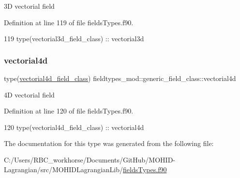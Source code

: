 3D vectorial field 



Definition at line 119 of file fields\+Types.\+f90.


\begin{DoxyCode}
119         \textcolor{keywordtype}{type}(vectorial3d\_field\_class) :: vectorial3d
\end{DoxyCode}
\mbox{\label{structfieldtypes__mod_1_1generic__field__class_a9a4f0f601cf52de94dcbbaa0a48bcf95}} 
\subsubsection{\texorpdfstring{vectorial4d}{vectorial4d}}
{\footnotesize\ttfamily type(\mbox{\hyperlink{structfieldtypes__mod_1_1vectorial4d__field__class}{vectorial4d\+\_\+field\+\_\+class}}) fieldtypes\+\_\+mod\+::generic\+\_\+field\+\_\+class\+::vectorial4d\hspace{0.3cm}{\ttfamily [private]}}



4D vectorial field 



Definition at line 120 of file fields\+Types.\+f90.


\begin{DoxyCode}
120         \textcolor{keywordtype}{type}(vectorial4d\_field\_class) :: vectorial4d
\end{DoxyCode}


The documentation for this type was generated from the following file\+:\begin{DoxyCompactItemize}
\item 
C\+:/\+Users/\+R\+B\+C\+\_\+workhorse/\+Documents/\+Git\+Hub/\+M\+O\+H\+I\+D-\/\+Lagrangian/src/\+M\+O\+H\+I\+D\+Lagrangian\+Lib/\mbox{\hyperlink{fields_types_8f90}{fields\+Types.\+f90}}\end{DoxyCompactItemize}

